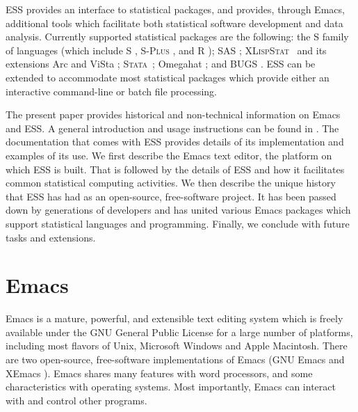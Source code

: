 \documentclass{article}
\newcommand*{\SAS}{\textsc{SAS}{\textregistered} }
\newcommand*{\Splus}{\textsc{S-Plus}}
\newcommand*{\XLispStat}{\textsc{XLispStat}}
\newcommand*{\Stata}{\textsc{Stata}}
\begin{document}
ESS provides an interface to statistical packages, and provides,
through Emacs, additional tools which facilitate both statistical
software development and data analysis.  Currently supported
statistical packages are the following: the S family of languages (which include
S \citep{BecRCW88,ChaJH92,ChaJ98}, \Splus{} \citep{Splus}, and R
\citep{ihak:gent:1996}); \SAS \citep{SAS:8}; \XLispStat\ 
\citep{Tier90} and its extensions Arc \citep{Cook:Weisberg:1999} and
ViSta \citep{youn:fald:mcfa:1992}; \Stata\ \citep{Stata:6.0}; Omegahat
\citep{DTLang:2000}; and BUGS \citep{BUGS}.  ESS can be
extended to accommodate most statistical packages which provide either
an interactive command-line or batch file processing.

The present paper provides historical and non-technical information on
Emacs and ESS.  A general introduction and usage instructions can be
found in \cite{heiberger:dsc:2001}.  The documentation that comes with
ESS provides details of its implementation and examples of its use.
We first describe the Emacs text editor, the platform on which ESS is
built.  That is followed by the details of ESS and how it facilitates
common statistical computing activities.  We then describe the unique
history that ESS has had as an open-source, free-software project.  
It has been passed down by generations of developers and has 
united various Emacs packages which support
statistical languages and programming.  Finally, we conclude with
future tasks and extensions.

\section{Emacs}
\label{sec:emacs}

Emacs is a mature, powerful, and extensible text editing system which
is freely available under the GNU General Public License for a large
number of platforms, including most flavors of Unix, Microsoft Windows
and Apple Macintosh.  There are two open-source, free-software
implementations of Emacs (GNU Emacs \citep{GNU Emacs} and XEmacs
\citep{XEmacs}).  Emacs shares many features with
word processors, and some characteristics with operating systems.
Most importantly, Emacs can interact with and control other programs.
\end{document}
